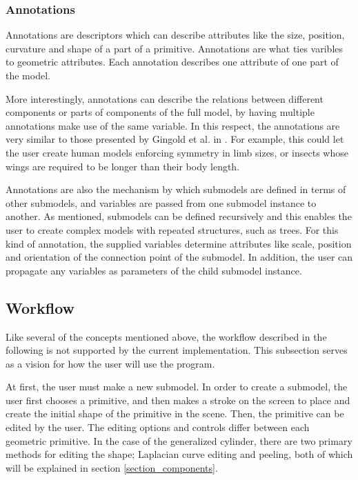 \documentclass[english]{article}
\begin{document}
\subsubsection{Annotations}

Annotations are descriptors which can describe attributes like the size, position, curvature and shape of a part of a primitive. Annotations are what ties varibles to geometric attributes. Each annotation describes one attribute of one part of the model.

More interestingly, annotations can describe the relations between different components or parts of components of the full model, by having multiple annotations make use of the same variable. In this respect, the annotations are very similar to those presented by Gingold et al. in \cite{gingold09}. For example, this could let the user create human models enforcing symmetry in limb sizes, or insects whose wings are required to be longer than their body length.

Annotations are also the mechanism by which submodels are defined in terms of other submodels, and variables are passed from one submodel instance to another. As mentioned, submodels can be defined recursively and this enables the user to create complex models with repeated structures, such as trees. For this kind of annotation, the supplied variables determine attributes like scale, position and orientation of the connection point of the submodel. In addition, the user can propagate any variables as parameters of the child submodel instance.


\subsection{Workflow}

Like several of the concepts mentioned above, the workflow described in the following is not supported by the current implementation. This subsection serves as a vision for how the user will use the program.

At first, the user must make a new submodel.
In order to create a submodel, the user first chooses a primitive, and then makes a stroke on the screen to place and create the initial shape of the primitive in the scene. Then, the primitive can be edited by the user. The editing options and controls differ between each geometric primitive. In the case of the generalized cylinder, there are two primary methods for editing the shape; Laplacian curve editing and peeling, both of which will be explained in section \ref{section_components}.
\end{document}
